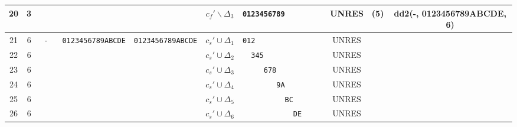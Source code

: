 \documentclass[10pt, a4paper]{article}
\begin{document}
\begin{landscape}
\begin{tabular}{|c|c|c|c|c|c|c|c|c|c|}
  20  & 3 & \verb+    +&  & & $c_f' \backslash \Delta_3 $ & \verb+0123456789           + & UNRES & (5) & dd2(-, 0123456789ABCDE, 6) \\ \hline
  21  & 6 & \verb+ -  +& \verb+0123456789ABCDE+  & \verb+0123456789ABCDE+ & $c_s' \cup \Delta_1 $ & \verb+012                 + & UNRES &  &  \\
  22  & 6 & \verb+    +&  & & $c_s' \cup \Delta_2 $ & \verb+  345               + & UNRES &  &  \\
  23  & 6 & \verb+    +&  & & $c_s' \cup \Delta_3 $ & \verb+     678            + & UNRES &  &  \\
  24  & 6 & \verb+    +&  & & $c_s' \cup \Delta_4 $ & \verb+        9A          + & UNRES &  &  \\
  25  & 6 & \verb+    +&  & & $c_s' \cup \Delta_5 $ & \verb+          BC        + & UNRES &  &  \\
  26  & 6 & \verb+    +&  & & $c_s' \cup \Delta_6 $ & \verb+            DE      + & UNRES &  &  \\ \hline
\end{tabular}
\end{landscape}
\end{document}
